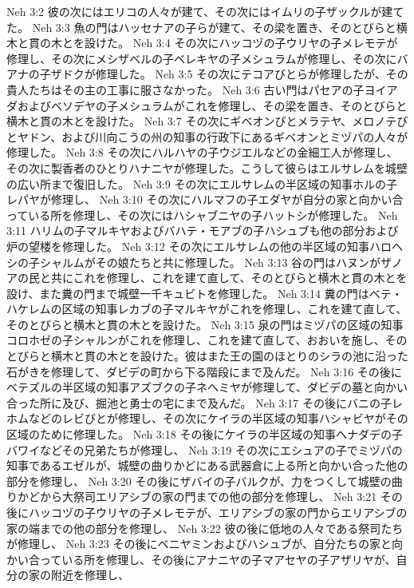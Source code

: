 Neh 3:2  彼の次にはエリコの人々が建て、その次にはイムリの子ザックルが建てた。
Neh 3:3  魚の門はハッセナアの子らが建て、その梁を置き、そのとびらと横木と貫の木とを設けた。
Neh 3:4  その次にハッコヅの子ウリヤの子メレモテが修理し、その次にメシザベルの子ベレキヤの子メシュラムが修理し、その次にバアナの子ザドクが修理した。
Neh 3:5  その次にテコアびとらが修理したが、その貴人たちはその主の工事に服さなかった。
Neh 3:6  古い門はパセアの子ヨイアダおよびベソデヤの子メシュラムがこれを修理し、その梁を置き、そのとびらと横木と貫の木とを設けた。
Neh 3:7  その次にギベオンびとメラテヤ、メロノテびとヤドン、および川向こうの州の知事の行政下にあるギベオンとミヅパの人々が修理した。
Neh 3:8  その次にハルハヤの子ウジエルなどの金細工人が修理し、その次に製香者のひとりハナニヤが修理した。こうして彼らはエルサレムを城壁の広い所まで復旧した。
Neh 3:9  その次にエルサレムの半区域の知事ホルの子レパヤが修理し、
Neh 3:10  その次にハルマフの子エダヤが自分の家と向かい合っている所を修理し、その次にはハシャブニヤの子ハットシが修理した。
Neh 3:11  ハリムの子マルキヤおよびバハテ・モアブの子ハシュブも他の部分および炉の望楼を修理した。
Neh 3:12  その次にエルサレムの他の半区域の知事ハロヘシの子シャルムがその娘たちと共に修理した。
Neh 3:13  谷の門はハヌンがザノアの民と共にこれを修理し、これを建て直して、そのとびらと横木と貫の木とを設け、また糞の門まで城壁一千キュビトを修理した。
Neh 3:14  糞の門はベテ・ハケレムの区域の知事レカブの子マルキヤがこれを修理し、これを建て直して、そのとびらと横木と貫の木とを設けた。
Neh 3:15  泉の門はミヅパの区域の知事コロホゼの子シャルンがこれを修理し、これを建て直して、おおいを施し、そのとびらと横木と貫の木とを設けた。彼はまた王の園のほとりのシラの池に沿った石がきを修理して、ダビデの町から下る階段にまで及んだ。
Neh 3:16  その後にベテズルの半区域の知事アズブクの子ネヘミヤが修理して、ダビデの墓と向かい合った所に及び、掘池と勇士の宅にまで及んだ。
Neh 3:17  その後にバニの子レホムなどのレビびとが修理し、その次にケイラの半区域の知事ハシャビヤがその区域のために修理した。
Neh 3:18  その後にケイラの半区域の知事ヘナダデの子バワイなどその兄弟たちが修理し、
Neh 3:19  その次にエシュアの子でミヅパの知事であるエゼルが、城壁の曲りかどにある武器倉に上る所と向かい合った他の部分を修理し、
Neh 3:20  その後にザバイの子バルクが、力をつくして城壁の曲りかどから大祭司エリアシブの家の門までの他の部分を修理し、
Neh 3:21  その後にハッコヅの子ウリヤの子メレモテが、エリアシブの家の門からエリアシブの家の端までの他の部分を修理し、
Neh 3:22  彼の後に低地の人々である祭司たちが修理し、
Neh 3:23  その後にベニヤミンおよびハシュブが、自分たちの家と向かい合っている所を修理し、その後にアナニヤの子マアセヤの子アザリヤが、自分の家の附近を修理し、
